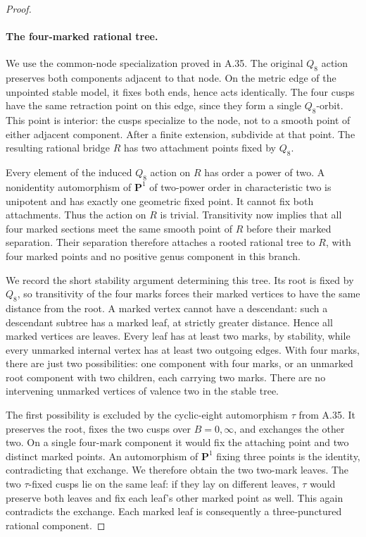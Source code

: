 \begin{proof}
\paragraph{The four-marked rational tree.}
We use the common-node specialization proved in A.35.
The original \(Q_8\) action preserves both components
adjacent to that node. On the metric edge of the unpointed
stable model, it fixes both ends, hence acts identically.
The four cusps have the same retraction point on this
edge, since they form a single \(Q_8\)-orbit. This point
is interior: the cusps specialize to the node, not to a
smooth point of either adjacent component.
After a finite extension, subdivide at that point.
The resulting rational bridge \(R\) has two attachment
points fixed by \(Q_8\).

Every element of the induced \(Q_8\) action on \(R\)
has order a power of two. A nonidentity automorphism
of \(\mathbf P^1\) of two-power order in characteristic
two is unipotent and has exactly one geometric fixed
point. It cannot fix both attachments. Thus the action
on \(R\) is trivial. Transitivity now implies that all
four marked sections meet the same smooth point of
\(R\) before their marked separation.
Their separation therefore attaches a rooted rational
tree to \(R\), with four marked points and no positive
genus component in this branch.

We record the short stability argument determining this
tree. Its root is fixed by \(Q_8\), so transitivity of
the four marks forces their marked vertices to have
the same distance from the root. A marked vertex
cannot have a descendant: such a descendant subtree
has a marked leaf, at strictly greater distance.
Hence all marked vertices are leaves. Every leaf has
at least two marks, by stability, while every unmarked
internal vertex has at least two outgoing edges.
With four marks, there are just two possibilities:
one component with four marks, or an unmarked root
component with two children, each carrying two marks.
There are no intervening unmarked vertices of valence
two in the stable tree.

The first possibility is excluded by the cyclic-eight
automorphism \(\tau\) from A.35. It preserves the root,
fixes the two cusps over \(B=0,\infty\), and exchanges
the other two. On a single four-mark component it would
fix the attaching point and two distinct marked points.
An automorphism of \(\mathbf P^1\) fixing three points
is the identity, contradicting that exchange. We
therefore obtain the two two-mark leaves.
The two \(\tau\)-fixed cusps lie on the same leaf:
if they lay on different leaves, \(\tau\) would preserve
both leaves and fix each leaf's other marked point as
well. This again contradicts the exchange.
Each marked leaf is consequently a three-punctured
rational component.


\end{proof}
